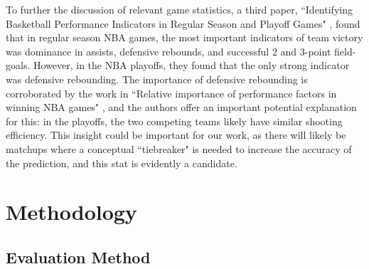 \documentclass[letterpaper]{article} %
\begin{document}
To further the discussion of relevant game statistics, a third paper, ``Identifying Basketball Performance Indicators in Regular Season and Playoff Games" \cite{IdentifyingBasketballPerformanceIndicatorsinRegularSeasonandPlayoffGames}, found that in regular season NBA games, the most important indicators of team victory was dominance in assists, defensive rebounds,  and successful 2 and 3-point field-goals. However, in the NBA playoffs, they found that the only strong indicator was defensive rebounding. The importance of defensive rebounding is corroborated by the work in ``Relative importance of performance factors in winning NBA games" \cite{RelativeImportanceofPerformanceFactorsinWinningNBAGamesinRegularSeasonversusPlayoffs}, and the authors offer an important potential explanation for this: in the playoffs, the two competing teams likely have similar shooting efficiency. This insight could be important for our work, as there will likely be matchups where a conceptual ``tiebreaker" is needed to increase the accuracy of the prediction, and this stat is evidently a candidate.


\section{Methodology}

\subsection{Evaluation Method}
\end{document}
